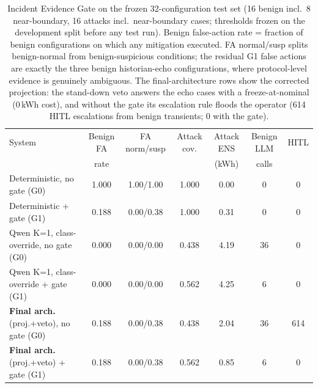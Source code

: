 \begin{table}[t]
\centering\small
\caption{Incident Evidence Gate on the frozen 32-configuration test set
(16 benign incl.\ 8 near-boundary, 16 attacks incl.\ near-boundary cases;
thresholds frozen on the development split before any test run). Benign
false-action rate = fraction of benign configurations on which any
mitigation executed. FA normal/susp splits benign-normal from
benign-suspicious conditions; the residual G1 false actions are exactly the
three benign historian-echo configurations, where protocol-level evidence is
genuinely ambiguous. The final-architecture rows show the corrected
projection: the stand-down veto answers the echo cases with a
freeze-at-nominal (0\,kWh cost), and without the gate its escalation rule
floods the operator (614 HITL escalations from benign transients; 0 with
the gate).}
\label{tab:gate}
\begin{tabular}{lcccccc}
\toprule
System & Benign FA & FA norm/susp & Attack cov. & Attack ENS & Benign LLM
& HITL \\
 & rate & & & (kWh) & calls & \\
\midrule
Deterministic, no gate (G0) & 1.000 & 1.00/1.00 & 1.000 & 0.00 & 0 & 0 \\
Deterministic + gate (G1) & 0.188 & 0.00/0.38 & 1.000 & 0.31 & 0 & 0 \\
Qwen K=1, class-override, no gate (G0) & 0.000 & 0.00/0.00 & 0.438 & 4.19 & 36 & 0 \\
Qwen K=1, class-override + gate (G1) & 0.000 & 0.00/0.00 & 0.562 & 4.25 & 6 & 0 \\
\textbf{Final arch.} (proj.+veto), no gate (G0) & 0.188 & 0.00/0.38 & 0.438 & 2.04 & 36 & 614 \\
\textbf{Final arch.} (proj.+veto) + gate (G1) & 0.188 & 0.00/0.38 & 0.562 & 0.85 & 6 & 0 \\
\bottomrule
\end{tabular}
\end{table}

